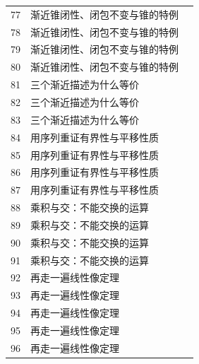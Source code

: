 \documentclass[11pt,a4paper]{article}
\theoremstyle{definition}\newtheorem{definition}{定义}\newtheorem{example}{例}
\begin{document}
\begin{longtable}{r p{.66\linewidth} r}
77 & 渐近锥闭性、闭包不变与锥的特例 & \pageref{g:109:76}\\

78 & 渐近锥闭性、闭包不变与锥的特例 & \pageref{g:109:76}\\

79 & 渐近锥闭性、闭包不变与锥的特例 & \pageref{g:109:76}\\

80 & 渐近锥闭性、闭包不变与锥的特例 & \pageref{g:109:76}\\

81 & 三个渐近描述为什么等价 & \pageref{g:109:81}\\

82 & 三个渐近描述为什么等价 & \pageref{g:109:81}\\

83 & 三个渐近描述为什么等价 & \pageref{g:109:81}\\

84 & 用序列重证有界性与平移性质 & \pageref{g:109:84}\\

85 & 用序列重证有界性与平移性质 & \pageref{g:109:84}\\

86 & 用序列重证有界性与平移性质 & \pageref{g:109:84}\\

87 & 用序列重证有界性与平移性质 & \pageref{g:109:84}\\

88 & 乘积与交：不能交换的运算 & \pageref{g:109:88}\\

89 & 乘积与交：不能交换的运算 & \pageref{g:109:88}\\

90 & 乘积与交：不能交换的运算 & \pageref{g:109:88}\\

91 & 乘积与交：不能交换的运算 & \pageref{g:109:88}\\

92 & 再走一遍线性像定理 & \pageref{g:109:92}\\

93 & 再走一遍线性像定理 & \pageref{g:109:92}\\

94 & 再走一遍线性像定理 & \pageref{g:109:92}\\

95 & 再走一遍线性像定理 & \pageref{g:109:92}\\

96 & 再走一遍线性像定理 & \pageref{g:109:92}\\


\end{longtable}
\end{document}
